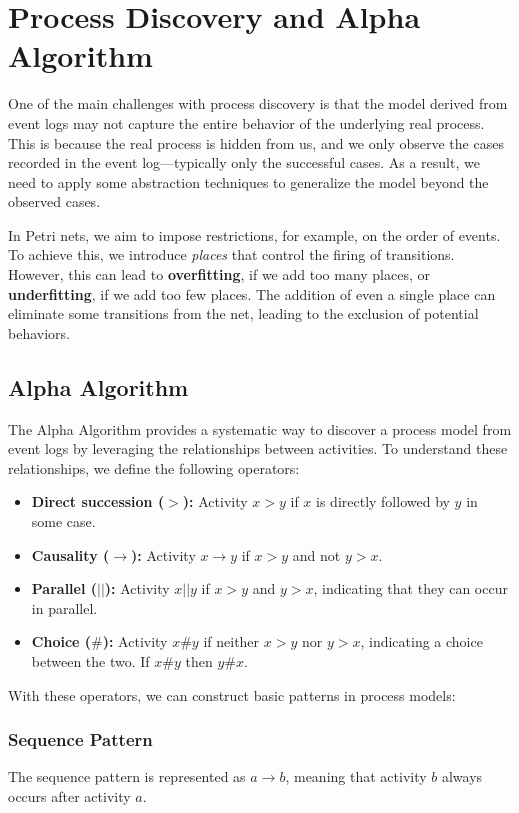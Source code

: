 \chapter{Process Discovery and Alpha Algorithm}
    
    One of the main challenges with process discovery is that the model derived from event logs may not capture the entire behavior of the underlying real process. This is because the real process is hidden from us, and we only observe the cases recorded in the event log—typically only the successful cases. As a result, we need to apply some abstraction techniques to generalize the model beyond the observed cases.
    
    In Petri nets, we aim to impose restrictions, for example, on the order of events. To achieve this, we introduce \textit{places} that control the firing of transitions. However, this can lead to \textbf{overfitting}, if we add too many places, or \textbf{underfitting}, if we add too few places. The addition of even a single place can eliminate some transitions from the net, leading to the exclusion of potential behaviors.
    
    \section{Alpha Algorithm}
    The Alpha Algorithm provides a systematic way to discover a process model from event logs by leveraging the relationships between activities. To understand these relationships, we define the following operators:
    \begin{itemize}
        \item \textbf{Direct succession (\(>\)):} Activity \(x > y\) if \(x\) is directly followed by \(y\) in some case.
        \item \textbf{Causality (\(\rightarrow\)):} Activity \(x \rightarrow y\) if \(x > y\) and not \(y > x\).
        \item \textbf{Parallel (\(||\)):} Activity \(x || y\) if \(x > y\) and \(y > x\), indicating that they can occur in parallel.
        \item \textbf{Choice (\(\#\)):} Activity \(x \# y\) if neither \(x > y\) nor \(y > x\), indicating a choice between the two. If $x\#y$ then $y\#x$.
    \end{itemize}
    
    With these operators, we can construct basic patterns in process models:
    
    \subsection{Sequence Pattern}
    The sequence pattern is represented as \(a \rightarrow b\), meaning that activity \(b\) always occurs after activity \(a\).
    
